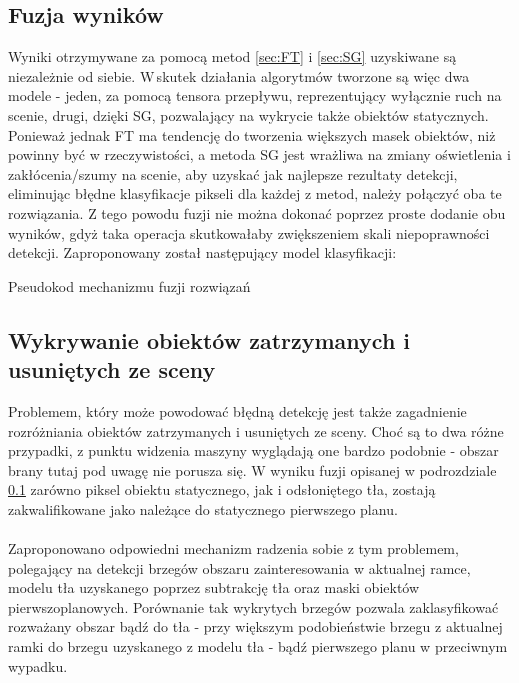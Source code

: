 \subsection{Fuzja wyników}
\label{sec:fuzja}
Wyniki otrzymywane za pomocą metod \ref{sec:FT} i \ref{sec:SG} uzyskiwane są niezależnie od siebie. W\,skutek działania algorytmów tworzone są więc dwa modele - jeden, za pomocą tensora przepływu, reprezentujący wyłącznie ruch na scenie, drugi, dzięki SG, pozwalający na wykrycie także obiektów statycznych. Ponieważ jednak FT ma tendencję do tworzenia większych masek obiektów, niż powinny być w rzeczywistości, a metoda SG jest wrażliwa na zmiany oświetlenia i zakłócenia/szumy na scenie, aby uzyskać jak najlepsze rezultaty detekcji, eliminując błędne klasyfikacje pikseli dla każdej z metod, należy połączyć oba te rozwiązania. Z tego powodu fuzji nie można dokonać poprzez proste dodanie obu wyników, gdyż taka operacja skutkowałaby zwiększeniem skali niepoprawności detekcji. Zaproponowany został następujący model klasyfikacji: \\
\begin{algorithm}[H]
 \caption{Pseudokod mechanizmu fuzji rozwiązań}
\end{algorithm}
\subsection{Wykrywanie obiektów zatrzymanych i usuniętych ze sceny}
Problemem, który może powodować błędną detekcję jest także zagadnienie rozróżniania obiektów zatrzymanych i usuniętych ze sceny. Choć są to dwa różne przypadki, z punktu widzenia maszyny wyglądają one bardzo podobnie - obszar brany tutaj pod uwagę nie porusza się. W wyniku fuzji opisanej w podrozdziale \ref{sec:fuzja} zarówno piksel obiektu statycznego, jak i odsłoniętego tła, zostają zakwalifikowane jako należące do statycznego pierwszego planu.
\paragraph{}
Zaproponowano odpowiedni mechanizm radzenia sobie z tym problemem, polegający na detekcji brzegów obszaru zainteresowania w aktualnej ramce, modelu tła uzyskanego poprzez subtrakcję tła oraz maski obiektów pierwszoplanowych. Porównanie tak wykrytych brzegów pozwala zaklasyfikować rozważany obszar bądź do tła - przy większym podobieństwie brzegu z aktualnej ramki do brzegu uzyskanego z modelu tła - bądź pierwszego planu w przeciwnym wypadku.
